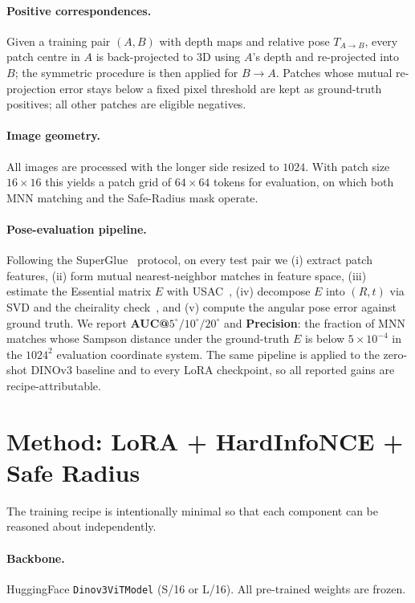 \documentclass[11pt,a4paper]{article}
\begin{document}
\paragraph{Positive correspondences.} Given a training pair $(A, B)$ with depth maps and relative
pose $T_{A\to B}$, every patch centre in $A$ is back-projected to 3D using $A$'s depth and
re-projected into $B$; the symmetric procedure is then applied for $B \to A$. Patches whose
mutual re-projection error stays below a fixed pixel threshold are kept as ground-truth positives;
all other patches are eligible negatives.

\paragraph{Image geometry.} All images are processed with the longer side resized to $1024$. With
patch size $16\!\times\!16$ this yields a patch grid of $64\!\times\!64$ tokens for evaluation, on
which both MNN matching and the Safe-Radius mask operate.

\paragraph{Pose-evaluation pipeline.} Following the SuperGlue~\cite{superglue} protocol, on every
test pair we (i) extract patch features, (ii) form mutual nearest-neighbor matches in feature space,
(iii) estimate the Essential matrix $E$ with USAC~\cite{usac}, (iv) decompose $E$ into $(R, t)$ via
SVD and the cheirality check~\cite{nister2004}, and (v) compute the angular pose error against
ground truth. We report \textbf{AUC@}$5^\circ\!/10^\circ\!/20^\circ$ and \textbf{Precision}: the
fraction of MNN matches whose Sampson distance under the ground-truth $E$ is below
$5\!\times\!10^{-4}$ in the $1024^2$ evaluation coordinate system. The same pipeline is applied to
the zero-shot DINOv3 baseline and to every LoRA checkpoint, so all reported gains are
recipe-attributable.

\section{Method: LoRA + HardInfoNCE + Safe Radius}

The training recipe is intentionally minimal so that each component can be reasoned about
independently.

\paragraph{Backbone.} HuggingFace \texttt{Dinov3ViTModel} (S/16 or L/16). All pre-trained weights are
frozen.
\end{document}
